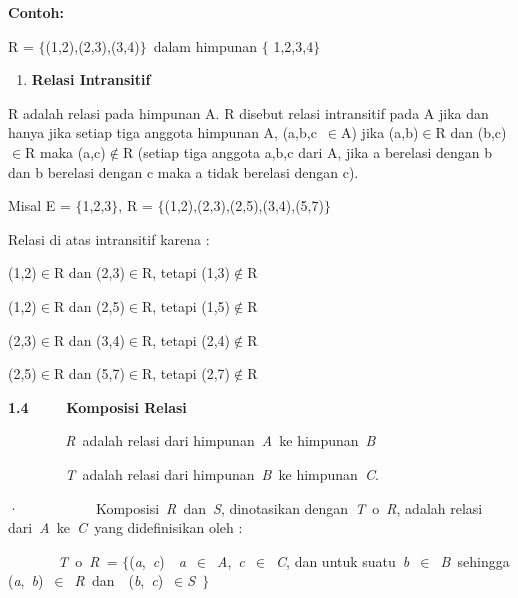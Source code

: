 \documentclass[11pt,fleqn]{book} %
\begin{document}
\noindent 

\noindent \textbf{Contoh:}

\noindent R = $\{$(1,2),(2,3),(3,4)$\}$~dalam himpunan $\{$ 1,2,3,4$\}$

\noindent 

\begin{enumerate}
\item  \textbf{Relasi Intransitif}
\end{enumerate}

\noindent 

\noindent R adalah relasi pada himpunan A. R disebut relasi intransitif pada A jika dan hanya jika setiap tiga anggota himpunan A, (a,b,c~$\mathrm{\in }$A) jika (a,b)$\mathrm{\in }$R dan (b,c)$\mathrm{\in }$R maka (a,c)$\mathrm{\notin }$R (setiap tiga anggota a,b,c dari A, jika a berelasi dengan b dan b berelasi dengan c maka a tidak berelasi dengan c).

\noindent 

\noindent Misal E = $\{$1,2,3$\}$, R = $\{$(1,2),(2,3),(2,5),(3,4),(5,7)$\}$

\noindent Relasi di atas intransitif karena :

\noindent (1,2)$\mathrm{\in }$R dan (2,3)$\mathrm{\in }$R, tetapi (1,3)$\mathrm{\notin }$R

\noindent (1,2)$\mathrm{\in }$R dan (2,5)$\mathrm{\in }$R, tetapi (1,5)$\mathrm{\notin }$R

\noindent (2,3)$\mathrm{\in }$R dan (3,4)$\mathrm{\in }$R, tetapi (2,4)$\mathrm{\notin }$R

\noindent (2,5)$\mathrm{\in }$R dan (5,7)$\mathrm{\in }$R, tetapi (2,7)$\mathrm{\notin }$R

\noindent \textbf{1.4 ~~~~Komposisi Relasi}

\noindent 

\noindent \textit{~~~~~~~~R~}adalah relasi dari himpunan~\textit{A~}ke himpunan~\textit{B}

\noindent \textit{~~~~~~~~T~}adalah relasi dari himpunan~\textit{B~}ke himpunan~\textit{C}.

\noindent ·~~~~~~~~~~~Komposisi~\textit{R~}dan~\textit{S}, dinotasikan dengan~\textit{T~}$\mathrm{o}$~\textit{R}, adalah relasi dari~\textit{A~}ke~\textit{C~}yang didefinisikan oleh :

\noindent \textit{~~~~~~~T~}$\mathrm{o}$~\textit{R~}= $\{$(\textit{a},~\textit{c})~{\textbar}~\textit{a~}$\mathrm{\in }$~\textit{A},~\textit{c~}$\mathrm{\in }$~\textit{C}, dan untuk suatu~\textit{b~}$\mathrm{\in }$~\textit{B~}sehingga (\textit{a},~\textit{b})~$\mathrm{\in }$~\textit{R~}dan~~(\textit{b},~\textit{c})~$\mathrm{\in }$\textit{S~}$\}$
\end{document}
